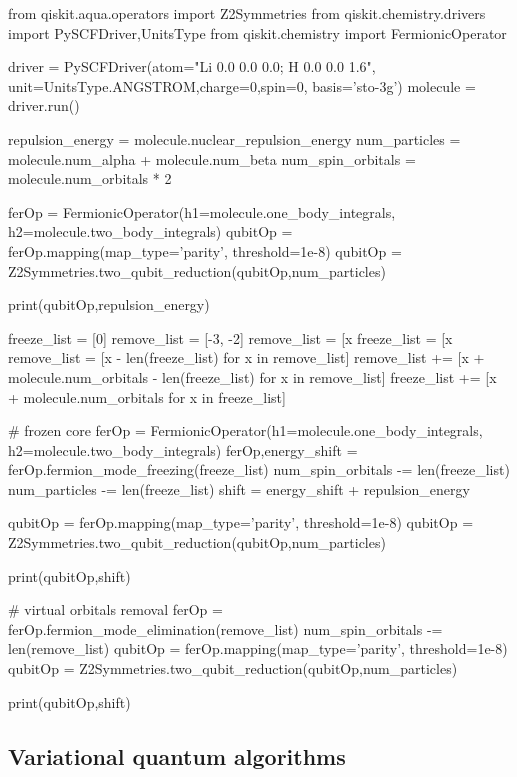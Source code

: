 \documentclass{article}
\begin{document}
\begin{python}
from qiskit.aqua.operators    import Z2Symmetries
from qiskit.chemistry.drivers import PySCFDriver,UnitsType
from qiskit.chemistry         import FermionicOperator

driver   = PySCFDriver(atom="Li 0.0 0.0 0.0; H 0.0 0.0 1.6",
                       unit=UnitsType.ANGSTROM,charge=0,spin=0,
                       basis='sto-3g')
molecule = driver.run()

repulsion_energy  = molecule.nuclear_repulsion_energy
num_particles     = molecule.num_alpha + molecule.num_beta
num_spin_orbitals = molecule.num_orbitals * 2

ferOp   = FermionicOperator(h1=molecule.one_body_integrals,
                            h2=molecule.two_body_integrals)
qubitOp = ferOp.mapping(map_type='parity', threshold=1e-8)
qubitOp = Z2Symmetries.two_qubit_reduction(qubitOp,num_particles)

print(qubitOp,repulsion_energy)

freeze_list  = [0]
remove_list  = [-3, -2]
remove_list  = [x %
freeze_list  = [x %
remove_list  = [x - len(freeze_list)      for x in remove_list]
remove_list += [x + molecule.num_orbitals - len(freeze_list) 
                for x in remove_list]
freeze_list += [x + molecule.num_orbitals for x in freeze_list]

# frozen core
ferOp  = FermionicOperator(h1=molecule.one_body_integrals,
                           h2=molecule.two_body_integrals)
ferOp,energy_shift = ferOp.fermion_mode_freezing(freeze_list)
num_spin_orbitals -= len(freeze_list)
num_particles     -= len(freeze_list)
shift              = energy_shift + repulsion_energy

qubitOp = ferOp.mapping(map_type='parity', threshold=1e-8)
qubitOp = Z2Symmetries.two_qubit_reduction(qubitOp,num_particles)

print(qubitOp,shift)

# virtual orbitals removal
ferOp              = ferOp.fermion_mode_elimination(remove_list)
num_spin_orbitals -= len(remove_list)
qubitOp = ferOp.mapping(map_type='parity', threshold=1e-8)
qubitOp = Z2Symmetries.two_qubit_reduction(qubitOp,num_particles)

print(qubitOp,shift)
\end{python}

\subsection{Variational quantum algorithms}
\end{document}
